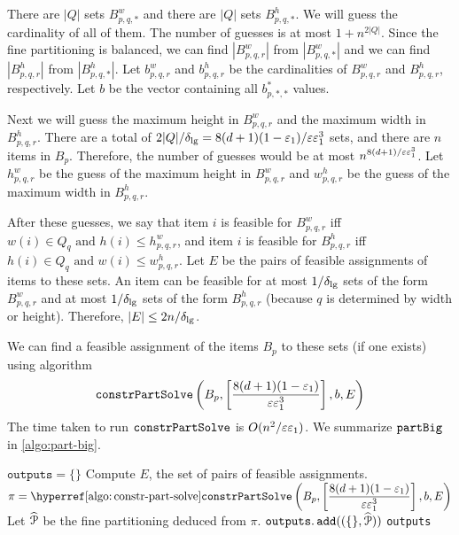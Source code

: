 There are $|Q|$ sets $B^w_{p,q,*}$ and there are $|Q|$ sets $B^h_{p,q,*}$.
We will guess the cardinality of all of them.
The number of guesses is at most $1 + n^{2|Q|}$.
Since the fine partitioning is balanced,
we can find $|B^w_{p,q,r}|$ from $|B^w_{p,q,*}|$
and we can find $|B^h_{p,q,r}|$ from $|B^h_{p,q,*}|$.
Let $b^w_{p,q,r}$ and $b^h_{p,q,r}$ be the cardinalities of
$B^w_{p,q,r}$ and $B^h_{p,q,r}$, respectively.
Let $b$ be the vector containing all $b^{*}_{p,*,*}$ values.

Next we will guess the maximum height in $B^w_{p,q,r}$ and the maximum width in $B^h_{p,q,r}$.
There are a total of $2|Q|/\delta_{\mathrm{lg}} = 8(d+1)(1-\varepsilon_1)/\varepsilon\varepsilon_1^3$ sets,
and there are $n$ items in $B_p$.
Therefore, the number of guesses would be at most ${\displaystyle n^{8(d+1)/\varepsilon\varepsilon_1^3}}$.
Let $h^w_{p,q,r}$ be the guess of the maximum height in $B^w_{p,q,r}$
and $w^h_{p,q,r}$ be the guess of the maximum width in $B^h_{p,q,r}$.

After these guesses, we say that item $i$ is feasible for $B^w_{p,q,r}$ iff
$w(i) \in Q_q \textrm{ and } h(i) \le h^w_{p,q,r}$,
and item $i$ is feasible for $B^h_{p,q,r}$ iff
$h(i) \in Q_q \textrm{ and } w(i) \le w^h_{p,q,r}$.
Let $E$ be the pairs of feasible assignments of items to these sets.
An item can be feasible for at most $1/\delta_{\mathrm{lg}}$ sets of the form $B^w_{p,q,r}$
and at most $1/\delta_{\mathrm{lg}}$ sets of the form $B^h_{p,q,r}$
(because $q$ is determined by width or height).
Therefore, $|E| \le 2n/\delta_{\mathrm{lg}}$.

We can find a feasible assignment of the items $B_p$ to these sets (if one exists) using algorithm
\[ \operatorname{\mathtt{constrPartSolve}}\left(B_p, \left[ \frac{8(d+1)(1-\varepsilon_1)}{\varepsilon\varepsilon_1^3} \right], b, E\right) \]
The time taken to run $\operatorname{\mathtt{constrPartSolve}}$ is $O(n^2/\varepsilon\varepsilon_1)$.
We summarize $\operatorname{\mathtt{partBig}}$ in \cref{algo:part-big}.

\begin{algorithm}[htb]
\caption{$\partBig(B_p)$:}
\label{algo:part-big}
\begin{algorithmic}[1]
\State $\texttt{outputs} = \{\}$
        \State Compute $E$, the set of pairs of feasible assignments.
        \State $\pi = {\displaystyle \constrPartSolveHyp\left(B_p,
            \left[ \frac{8(d+1)(1-\epsLarge)}{\eps\epsLarge^3} \right], b, E\right) }$
            \State Let $\widehat{\mathcal{P}}$ be the fine partitioning deduced from $\pi$.
            \State $\operatorname{\mathtt{outputs.add}}((\{\}, \widehat{\mathcal{P}}))$
        \EndIf
    \EndFor
\EndFor
\State \Return \texttt{outputs}
\end{algorithmic}
\end{algorithm}

